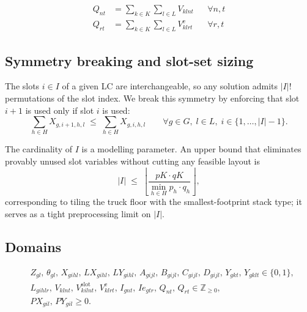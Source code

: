 \begin{align}
Q_{nt}&=\sum_{k\in K}\sum_{l\in L} V_{klnt}
    &&\forall n,t
    \label{sb:eq:flow-n}\\
Q_{rt}&=\sum_{k\in K}\sum_{l\in L} V^{\mathrm{e}}_{klrt}
    &&\forall r,t
    \label{sb:eq:flow-r}
\end{align}

\subsection{Symmetry breaking and slot-set sizing}
\label{sb:sec:symm}

The slots $i\in I$ of a given LC are interchangeable, so any solution
admits $|I|!$ permutations of the slot index. We break this symmetry
by enforcing that slot $i+1$ is used only if slot $i$ is used:
\begin{equation}
\sum_{h\in H} X_{g,i+1,h,l}\;\le\;\sum_{h\in H} X_{g,i,h,l}
\qquad \forall g\in G,\; l\in L,\; i\in\{1,\dots,|I|-1\}.
\label{sb:eq:sym}
\end{equation}

The cardinality of $I$ is a modelling parameter. An upper bound that
eliminates provably unused slot variables without cutting any feasible
layout is
\begin{equation}
|I|\;\le\;\left\lfloor
    \frac{pK\cdot qK}{\min_{h\in H} p_{h}\cdot q_{h}}
\right\rfloor,
\label{sb:eq:Ibound}
\end{equation}
corresponding to tiling the truck floor with the smallest-footprint
stack type; it serves as a tight preprocessing limit on $|I|$.

\subsection*{Domains}

{\color{blue}
\begin{align*}
&Z_{gl},\,\theta_{gl},\,X_{gihl},\,LX_{gihl},\,LY_{gihl},\,
  A_{gijl},\,B_{gijl},\,C_{gijl},\,D_{gijl},\,
  Y_{gkt},\,Y_{gklt}\in\{0,1\},\\
&L_{gihlr},\,V_{klnt},\,V^{\mathrm{slot}}_{kilnt},\,
  V^{\mathrm{e}}_{klrt},\,I_{gnt},\,Ie_{gtr},\,Q_{nt},\,Q_{rt}
  \in\mathbb{Z}_{\ge 0},\\
&PX_{gil},\,PY_{gil}\ge 0.
\end{align*}
}



